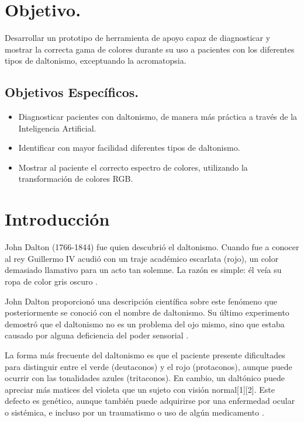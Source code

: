 \documentclass[10pt]{article}
\begin{document}
\section{Objetivo.}

Desarrollar un prototipo de herramienta de apoyo capaz de diagnosticar y mostrar la correcta gama de colores durante su uso  a pacientes con los diferentes tipos de daltonismo, exceptuando la acromatopsia. 

\subsection{Objetivos Específicos.}
\begin{itemize}
\item Diagnosticar pacientes con daltonismo, de manera más práctica a través de la Inteligencia Artificial.
 \item Identificar con mayor facilidad diferentes tipos de daltonismo.
\item Mostrar al paciente el correcto espectro de colores, utilizando la transformación de colores RGB.
\end{itemize}


\newpage

\section{Introducción}
John Dalton (1766-1844) fue quien descubrió el daltonismo. Cuando fue a conocer al rey Guillermo IV acudió con un traje académico escarlata (rojo), un color demasiado llamativo para un acto tan solemne. La razón es simple: él veía su ropa de color gris oscuro \cite{IEEEreferencias:Ref1}.


\setlength{\parskip}{2mm}

John Dalton proporcionó una descripción científica sobre este fenómeno que posteriormente se conoció con el nombre de daltonismo. Su último experimento demostró que el daltonismo no es un problema del ojo mismo, sino que estaba causado por alguna deficiencia del poder sensorial \cite{IEEEreferencias:Ref1}.


\setlength{\parskip}{2mm}

La forma más frecuente del daltonismo es que el paciente presente dificultades para distinguir entre el verde (deutaconos) y el rojo (protaconos), aunque puede ocurrir con las tonalidades azules (tritaconos). En cambio, un daltónico puede apreciar más matices del violeta que un sujeto con visión normal[1][2]. Este defecto es genético, aunque también puede adquirirse por una enfermedad ocular o sistémica, e incluso por un traumatismo o uso de algún medicamento \cite{IEEEreferencias:Ref3}.
\end{document}
